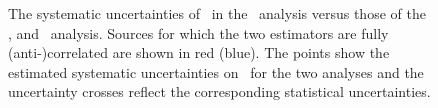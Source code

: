 \begin{figure}[t!]
\centering
{}
\caption[Estimator correlations for the $\sqrts=7$~\TeV\ analyses]{
%
The systematic uncertainties of \mt\ in the \dil\ analysis versus those of the  \threed,  \twod and  \oned \ljets\ analysis.
%
Sources for which the two estimators are fully \mbox{(anti-)}correlated are shown in red (blue).
%
%
The points show the estimated systematic uncertainties on \mt\ for the two analyses and the uncertainty crosses reflect the corresponding statistical uncertainties. }
%
\label{fig:LJDLsystCorrTG7TeV}
%
\end{figure}
